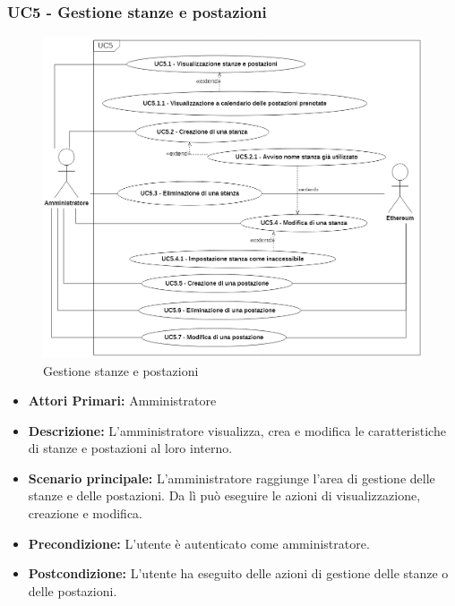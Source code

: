 \subsubsection{ UC5 - Gestione stanze e postazioni}
\begin{figure}[H]
	\centering
	\includegraphics[width=18cm]{res/images/UC5.png}
	\caption{Gestione stanze e postazioni}
	\label{fig:Gestione stanze e postazioni}
\end{figure}
\begin{itemize}
           	\item\textbf{Attori Primari:} 
           	Amministratore
           	\item\textbf{Descrizione:} 
           	L'amministratore visualizza, crea e modifica le caratteristiche di stanze e postazioni al loro interno.
           	\item\textbf{Scenario principale:} 
           	L'amministratore raggiunge l'area di gestione delle stanze e delle postazioni. Da lì può eseguire le azioni di visualizzazione, creazione e modifica.
           	\item\textbf{Precondizione:} 
           	L'utente è autenticato come amministratore.
           	\item\textbf{Postcondizione:}
           	L'utente ha eseguito delle azioni di gestione delle stanze o delle postazioni.
\end{itemize}

